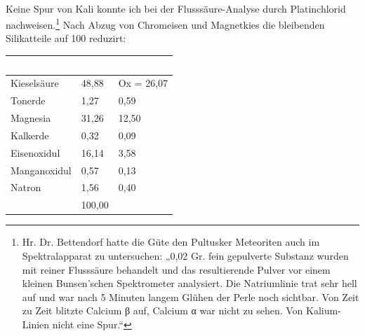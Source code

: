 \documentclass[a4paper, 11pt, oneside, german]{article}
\begin{document}
\paragraph{}
Keine Spur von Kali konnte ich bei der Flusssäure-Analyse durch Platinchlorid nachweisen.\footnote{Hr. Dr. Bettendorf hatte die Güte den Pultusker Meteoriten auch im Spektralapparat zu untersuchen: „0,02 Gr. fein gepulverte Substanz wurden mit reiner Flusssäure behandelt und das resultierende Pulver vor einem kleinen Bunsen'schen Spektrometer analysiert. Die Natriumlinie trat sehr hell auf und war nach 5 Minuten langem Glühen der Perle noch sichtbar. Von Zeit zu Zeit blitzte Calcium β auf, Calcium α war nicht zu sehen. Von Kalium-Linien nicht eine Spur.“} Nach Abzug von Chromeisen und Magnetkies die bleibenden Silikatteile auf 100 reduzirt:
\begin{table}[H]
    \centering
    \begin{tabular}{|l|l|l|}
    \hline
        ~ & ~ & ~ \\ \hline
        Kieselsäure & 48,88 & Ox = 26,07 \\ \hline
        Tonerde & 1,27 & 0,59 \\ \hline
        Magnesia & 31,26 & 12,50 \\ \hline
        Kalkerde & 0,32 & 0,09 \\ \hline
        Eisenoxidul & 16,14 & 3,58 \\ \hline
        Manganoxidul & 0,57 & 0,13 \\ \hline
        Natron & 1,56 & 0,40 \\ \hline
        ~ & 100,00 & ~ \\ \hline
    \end{tabular}
\end{table}
\end{document}
